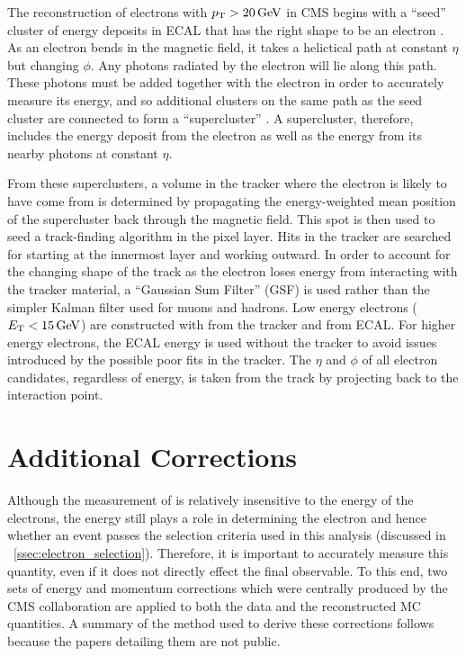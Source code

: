 The reconstruction of electrons with $p_{\mathrm{T}} > 20 \,\text{Ge\hspace{-.08em}V}$ in CMS begins with a
``seed'' cluster of energy deposits in ECAL that has the right shape to be an
electron \cite{eg_reco_2010}. As an electron bends in the magnetic field, it
takes a helictical path at constant $\eta$ but changing $\phi$. Any photons
radiated by the electron will lie along this path. These photons must be added
together with the electron in order to accurately measure its energy, and so
additional clusters on the same path as the seed cluster are connected to form
a ``supercluster'' \cite{baffioni_2007}. A supercluster, therefore, includes
the energy deposit from the electron as well as the energy from its nearby
photons at constant $\eta$.

From these superclusters, a volume in the tracker where the electron is likely
to have come from is determined by propagating the energy-weighted mean
position of the supercluster back through the magnetic field. This spot is then
used to seed a track-finding algorithm in the pixel layer. Hits in the tracker
are searched for starting at the innermost layer and working outward. In order
to account for the changing shape of the track as the electron loses energy
from interacting with the tracker material, a ``Gaussian Sum Filter'' (GSF)
\cite{adam_2005} is used rather than the simpler Kalman filter used for muons
and hadrons. Low energy electrons ($E_{\mathrm{T}} < 15 \,\text{Ge\hspace{-.08em}V}$) are constructed with \pt
from the tracker and \ET from ECAL. For higher energy electrons, the ECAL
energy is used without the tracker \pt to avoid issues introduced by the
possible poor fits in the tracker. The $\eta$ and $\phi$ of all electron
candidates, regardless of energy, is taken from the track by projecting back to
the interaction point.

\section{Additional Corrections}

Although the measurement of \phistar is relatively insensitive to the energy of
the electrons, the energy still plays a role in determining the electron \pt
and hence whether an event passes the selection criteria used in this analysis
(discussed in \SEC~\ref{ssec:electron_selection}). Therefore, it is important
to accurately measure this quantity, even if it does not directly effect the
final observable. To this end, two sets of energy and momentum corrections
which were centrally produced by the CMS collaboration are applied to both the
data and the reconstructed MC quantities. A summary of the method used to
derive these corrections follows because the papers detailing them are not
public.


